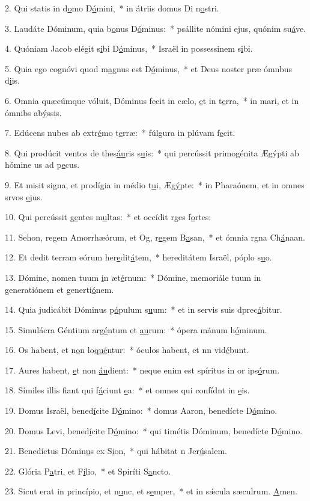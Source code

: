 2. Qui statis in d\uline{o}mo D\uline{ó}mini,~* in átriis domus Di n\uline{o}stri.\par 
3. Laudáte Dóminum, quia b\uline{o}nus D\uline{ó}minus:~* psállite nómini ejus, quónim su\uline{á}ve.\par 
4. Quóniam Jacob elégit s\uline{i}bi D\uline{ó}minus,~* Israël in possessinem s\uline{i}bi.\par 
5. Quia ego cognóvi quod m\uline{a}gnus est D\uline{ó}minus,~* et Deus noster præ ómnbus d\uline{i}is.\par 
6. Omnia quæcúmque vóluit, Dóminus fecit in cælo, \uline{e}t in t\uline{e}rra,~* in mari, et in ómnibs ab\uline{ý}ssis.\par 
7. Edúcens nubes ab extr\uline{é}mo t\uline{e}rræ:~* fúlgura in plúvam f\uline{e}cit.\par 
8. Qui prodúcit ventos de thes\uline{áu}ris s\uline{u}is:~* qui percússit primogénita Ægýpti ab hómine us ad p\uline{e}cus.\par 
9. Et misit signa, et prodígia in médio t\uline{u}i, Æg\uline{ý}pte:~* in Pharaónem, et in omnes srvos \uline{e}jus.\par 
10. Qui percússit g\uline{e}ntes m\uline{u}ltas:~* et occídit rges f\uline{o}rtes:\par 
11. Sehon, regem Amorrhæórum, et Og, r\uline{e}gem B\uline{a}san,~* et ómnia rgna Ch\uline{á}naan.\par 
12. Et dedit terram eórum her\uline{e}dit\uline{á}tem,~* hereditátem Israël, póplo s\uline{u}o.\par 
13. Dómine, nomen tuum \uline{i}n æt\uline{é}rnum:~* Dómine, memoriále tuum in generatiónem et generti\uline{ó}nem.\par 
14. Quia judicábit Dóminus p\uline{ó}pulum s\uline{u}um:~* et in servis suis dprec\uline{á}bitur.\par 
15. Simulácra Géntium arg\uline{é}ntum et \uline{au}rum:~* ópera mánum h\uline{ó}minum.\par 
16. Os habent, et n\uline{o}n lo\uline{qué}ntur:~* óculos habent, et nn vid\uline{é}bunt.\par 
17. Aures habent, \uline{e}t non \uline{áu}dient:~* neque enim est spíritus in or ips\uline{ó}rum.\par 
18. Símiles illis fiant qui f\uline{á}ciunt \uline{e}a:~* et omnes qui confídnt in \uline{e}is.\par 
19. Domus Israël, bened\uline{í}cite D\uline{ó}mino:~* domus Aaron, benedícte D\uline{ó}mino.\par 
20. Domus Levi, bened\uline{í}cite D\uline{ó}mino:~* qui timétis Dóminum, benedícte D\uline{ó}mino.\par 
21. Benedíctus Dómin\uline{u}s ex S\uline{i}on,~* qui hábitat n Jer\uline{ú}salem.\par 
22. Glória P\uline{a}tri, et F\uline{í}lio,~* et Spiríti S\uline{a}ncto.\par 
23. Sicut erat in princípio, et n\uline{u}nc, et s\uline{e}mper,~* et in sǽcula sæculrum. \uline{A}men.\par 
